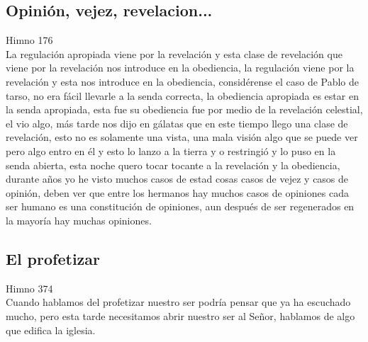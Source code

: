 \documentclass[12pt]{article}
\begin{document}
\subsection*{Opinión, vejez, revelacion...}

Himno 176\\

La regulación apropiada viene por la revelación y esta clase de revelación que viene por la revelación nos introduce en la obediencia, la regulación viene por la revelación y esta nos introduce en la obediencia, considérense el caso de Pablo de tarso, no era fácil llevarle a la senda correcta, la obediencia apropiada es estar en la senda apropiada, esta fue su obediencia fue por medio de la revelación celestial, el vio algo, más tarde nos dijo en gálatas que en este tiempo llego una clase de revelación, esto no es solamente una vista, una mala visión algo que se puede ver pero algo entro en él y esto lo lanzo a la tierra y o restringió y lo puso en la senda abierta, esta noche quero tocar tocante a la revelación y la obediencia, durante años yo he visto muchos casos de estad cosas casos de vejez y casos de opinión, deben ver que entre los hermanos hay muchos casos de opiniones cada ser humano es una constitución de opiniones, aun después de ser regenerados en la mayoría hay muchas opiniones.

\subsection*{El profetizar}

Himno 374\\

Cuando hablamos del profetizar nuestro ser podría pensar que ya ha escuchado mucho, pero esta tarde necesitamos abrir nuestro ser al Señor, hablamos de algo que edifica la iglesia.\\
\end{document}
